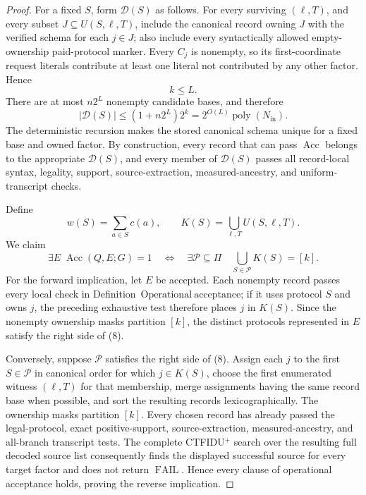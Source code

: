 \documentclass{article}
\begin{document}
\begin{proof}
For a fixed \(S\), form \(\mathcal D(S)\) as follows.  For every surviving \((\ell,T)\), and every subset \(J\subseteq U(S,\ell,T)\), include the canonical record owning \(J\) with the verified schema for each \(j\in J\); also include every syntactically allowed empty-ownership paid-protocol marker.  Every \(C_j\) is nonempty, so its first-coordinate request literals contribute at least one literal not contributed by any other factor.  Hence
\[
  k\leq L. \tag{5}
\]
There are at most \(n2^L\) nonempty candidate bases, and therefore
\[
  |\mathcal D(S)|\leq (1+n2^L)2^k
  =2^{O(L)}\operatorname{poly}(N_{\mathrm{in}}). \tag{6}
\]
The deterministic recursion makes the stored canonical schema unique for a fixed base and owned factor.  By construction, every record that can pass \(\operatorname{Acc}\) belongs to the appropriate \(\mathcal D(S)\), and every member of \(\mathcal D(S)\) passes all record-local syntax, legality, support, source-extraction, measured-ancestry, and uniform-transcript checks.

Define
\[
  w(S)=\sum_{a\in S}c(a),
  \qquad
  K(S)=\bigcup_{\ell,T}U(S,\ell,T). \tag{7}
\]
We claim
\[
  \exists E\;\operatorname{Acc}(Q,E;G)=1
  \quad\Longleftrightarrow\quad
  \exists\mathcal P\subseteq\Pi\quad
  \bigcup_{S\in\mathcal P}K(S)=[k]. \tag{8}
\]
For the forward implication, let \(E\) be accepted.  Each nonempty record passes every local check in Definition~\(\mathrm{Operational\ acceptance}\); if it uses protocol \(S\) and owns \(j\), the preceding exhaustive test therefore places \(j\) in \(K(S)\).  Since the nonempty ownership masks partition \([k]\), the distinct protocols represented in \(E\) satisfy the right side of (8).

Conversely, suppose \(\mathcal P\) satisfies the right side of (8).  Assign each \(j\) to the first \(S\in\mathcal P\) in canonical order for which \(j\in K(S)\), choose the first enumerated witness \((\ell,T)\) for that membership, merge assignments having the same record base when possible, and sort the resulting records lexicographically.  The ownership masks partition \([k]\).  Every chosen record has already passed the legal-protocol, exact positive-support, source-extraction, measured-ancestry, and all-branch transcript tests.  The complete CTFIDU\({}^{+}\) search over the resulting full decoded source list consequently finds the displayed successful source for every target factor and does not return \(\operatorname{FAIL}\).  Hence every clause of operational acceptance holds, proving the reverse implication.


\end{proof}
\end{document}
